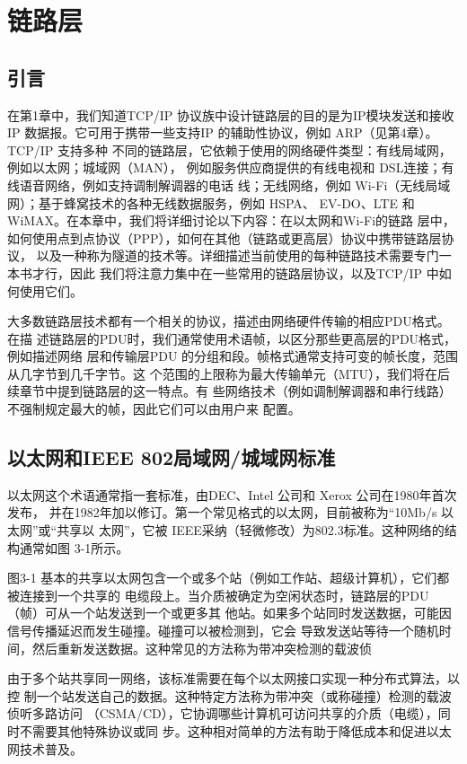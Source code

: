 \chapter{链路层}

\section{引言}

在第1章中，我们知道TCP/IP 协议族中设计链路层的目的是为IP模块发送和接收IP
数据报。它可用于携带一些支持IP 的辅助性协议，例如 ARP（见第4章）。TCP/IP 支持多种
不同的链路层，它依赖于使用的网络硬件类型：有线局域网，例如以太网；城域网（MAN），
例如服务供应商提供的有线电视和 DSL连接；有线语音网络，例如支持调制解调器的电话
线；无线网络，例如 Wi-Fi（无线局域网）；基于蜂窝技术的各种无线数据服务，例如 HSPA、
EV-DO、LTE 和 WiMAX。在本章中，我们将详细讨论以下内容：在以太网和Wi-Fi的链路
层中，如何使用点到点协议（PPP），如何在其他（链路或更高层）协议中携带链路层协议，
以及一种称为隧道的技术等。详细描述当前使用的每种链路技术需要专门一本书才行，因此
我们将注意力集中在一些常用的链路层协议，以及TCP/IP 中如何使用它们。

大多数链路层技术都有一个相关的协议，描述由网络硬件传输的相应PDU格式。在描
述链路层的PDU时，我们通常使用术语帧，以区分那些更高层的PDU格式，例如描述网络
层和传输层PDU 的分组和段。帧格式通常支持可变的帧长度，范围从几字节到几千字节。这
个范围的上限称为最大传输单元（MTU），我们将在后续章节中提到链路层的这一特点。有
些网络技术（例如调制解调器和串行线路）不强制规定最大的帧，因此它们可以由用户来
配置。

\section{以太网和IEEE 802局域网/城域网标准}

以太网这个术语通常指一套标准，由DEC、Intel 公司和 Xerox 公司在1980年首次发布，
并在1982年加以修订。第一个常见格式的以太网，目前被称为“10Mb/s 以太网”或“共享以
太网”，它被 IEEE采纳（轻微修改）为802.3标准。这种网络的结构通常如图 3-1所示。

图3-1 基本的共享以太网包含一个或多个站（例如工作站、超级计算机），它们都被连接到一个共享的
电缆段上。当介质被确定为空闲状态时，链路层的PDU（帧）可从一个站发送到一个或更多其
他站。如果多个站同时发送数据，可能因信号传播延迟而发生碰撞。碰撞可以被检测到，它会
导致发送站等待一个随机时间，然后重新发送数据。这种常见的方法称为带冲突检测的载波侦

由于多个站共享同一网络，该标准需要在每个以太网接口实现一种分布式算法，以控
制一个站发送自己的数据。这种特定方法称为带冲突（或称碰撞）检测的载波侦听多路访问
（CSMA/CD），它协调哪些计算机可访问共享的介质（电缆），同时不需要其他特殊协议或同
步。这种相对简单的方法有助于降低成本和促进以太网技术普及。

